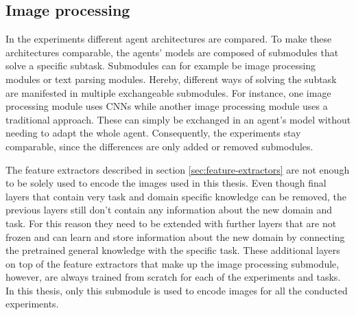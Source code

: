 
\subsection{Image processing}
\label{sec:image-processing}
In the experiments different agent architectures are compared.
To make these architectures comparable, the agents' models are composed of submodules that solve a specific subtask.
Submodules can for example be image processing modules or text parsing modules.
Hereby, different ways of solving the subtask are manifested in multiple exchangeable submodules.
For instance, one image processing module uses CNNs while another image processing module uses a traditional approach.
These can simply be exchanged in an agent's model without needing to adapt the whole agent.
Consequently, the experiments stay comparable, since the differences are only added or removed submodules.

The feature extractors described in section \ref{sec:feature-extractors} are not enough to be solely used to encode the images used in this thesis.
Even though final layers that contain very task and domain specific knowledge can be removed, the previous layers still don't contain any information about the new domain and task.
For this reason they need to be extended with further layers that are not frozen and can learn and store information about the new domain by connecting the pretrained general knowledge with the specific task.
These additional layers on top of the feature extractors that make up the image processing submodule, however, are always trained from scratch for each of the experiments and tasks.
In this thesis, only this submodule is used to encode images for all the conducted experiments.

